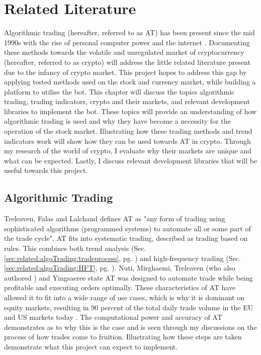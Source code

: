 %
\chapter{Related Literature}
\label{sec:related}
Algorithmic trading (hereafter, referred to as AT) has been present since the mid 1990s with the rise of personal computer power and the internet \cite{WEB:PISANI:2010}. Documenting these methods towards the volatile and unregulated market of cryptocurrency (hereafter, referred to as crypto) will address the little related literature present due to the infancy of crypto market. This project hopes to address this gap by applying tested methods used on the stock and currency market, while building a platform to utilise the bot. This chapter will discuss the topics algorithmic trading, trading indicators, crypto and their markets, and relevant development libraries to implement the bot. These topics will provide an understanding of how algorithmic trading is used and why they have become a necessity for the operation of the stock market. Illustrating how these trading methods and trend indicators work will show how they can be used towards AT in crypto. Through my research of the world of crypto, I evaluate why their markets are unique and what can be expected. Lastly, I discuss relevant development libraries that will be useful towards this project. 


\section{Algorithmic Trading}
\label{sec:related:algoTrading}
\noindent Treleaven, Falas and Lalchand \cite{ART:Treleaven:2013} defines AT as "any form of trading using sophisticated algorithms (programmed systems) to automate all or some part of the trade cycle". AT fits into systematic trading, described as trading based on rules. This combines both trend analysis (Sec. \ref{sec:related:algoTrading:tradeprocess}, pg. \pageref{sec:related:algoTrading:tradeprocess}) and high-frequency trading (Sec. \ref{sec:related:algoTrading:HFT},  pg. \pageref{sec:related:algoTrading:HFT}). Nuti, Mirghaemi, Treleaven (who also authored \cite{ART:Treleaven:2013}) and Yingsaeree \cite{ART:Nuti:2011} state AT was designed to automate trade while being profitable and executing orders optimally. These characteristics of AT have allowed it to fit into a wide range of use cases, which is why it is dominant on equity markets, resulting in 90 percent of the total daily trade volume in the EU and US markets today \cite{WEB:Cheng:2017,ART:Kolakowski:2018}. The computational power and accuracy of AT demonstrates as to why this is the case and is seen through my discussions on the process of how trades come to fruition. Illustrating how these steps are taken demonstrate what this project can expect to implement.

